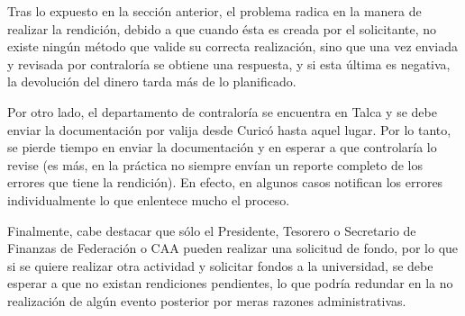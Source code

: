 Tras lo expuesto en la sección anterior, el problema radica en la manera de realizar la rendición, debido a que cuando ésta es creada por el solicitante, no existe ningún método que valide su correcta realización, sino que una vez enviada y revisada por contraloría se obtiene una respuesta, y si esta última es negativa, la devolución del dinero tarda más de lo planificado.

Por otro lado, el departamento de contraloría se encuentra en Talca y se debe enviar la documentación por valija desde Curicó hasta aquel lugar. Por lo tanto, se pierde tiempo en enviar la documentación y en esperar a que controlaría lo revise (es más, en la práctica no siempre envían un reporte completo de los errores que tiene la rendición). En efecto, en algunos casos notifican los errores individualmente lo que enlentece mucho el proceso.

Finalmente, cabe destacar que sólo el Presidente, Tesorero o Secretario de Finanzas de Federación o CAA pueden realizar una solicitud de fondo, por lo que si se quiere realizar otra actividad y solicitar fondos a la universidad, se debe esperar a que no existan rendiciones pendientes, lo que podría redundar en la no realización de algún evento posterior por meras razones administrativas.
